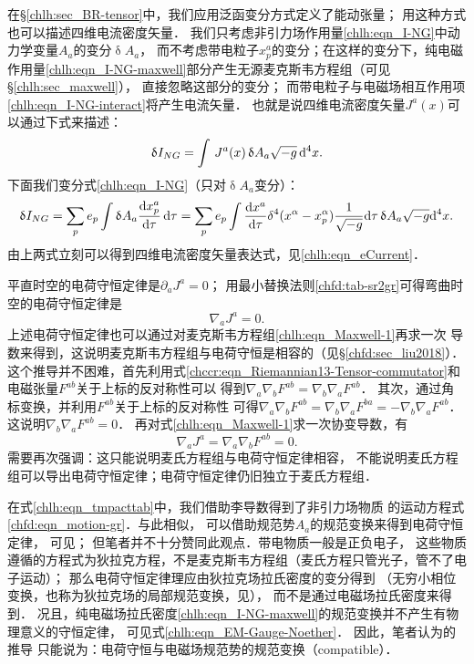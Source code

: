 在\S\ref{chlh:sec_BR-tensor}中，我们应用泛函变分方式定义了能动张量；
用这种方式也可以描述四维电流密度矢量．
我们只考虑非引力场作用量\eqref{chlh:eqn_I-NG}中动力学变量$A_a$的变分$\updelta A_a$，
而不考虑带电粒子$x^a_p$的变分；在这样的变分下，纯电磁
作用量\eqref{chlh:eqn_I-NG-maxwell}部分产生无源麦克斯韦方程组（可见\S\ref{chlh:sec_maxwell}），
直接忽略这部分的变分；
而带电粒子与电磁场相互作用项\eqref{chlh:eqn_I-NG-interact}将产生电流矢量．
也就是说四维电流密度矢量$J^a(x)$可以通过下式来描述：
\begin{equation}
    \updelta I_{NG} =  \int \, J^a(x) \, \updelta A_{a} \sqrt{-g} \, {\rm d}^4 x.
\end{equation}
下面我们变分式\eqref{chlh:eqn_I-NG}（只对$\updelta A_a$变分）：
\begin{equation*}
    \updelta I_{NG} = \sum_{p} e_{p} \int \updelta A_{a}
    \frac{{\rm d} x^a_p}{{\rm d} \tau}  \, {\rm d} \tau
    = \sum_{p} e_{p} \int  \frac{{\rm d} x^a}{{\rm d} \tau}
    \delta^4(x^\alpha-x^\alpha_p)\frac{1}{\sqrt{-g}} {\rm d} \tau
    \, \updelta A_{a} \sqrt{-g} {\rm d}^4 x. 
\end{equation*}
由上两式立刻可以得到四维电流密度矢量表达式，见\eqref{chlh:eqn_eCurrent}．

平直时空的电荷守恒定律是$\partial_a J^a =0 $；
用最小替换法则\ref{chfd:tab-sr2gr}可得弯曲时空的电荷守恒定律是
\begin{equation}\label{chlh:eqn_charge-conservation-curved}
    \nabla_a J^a =0 .
\end{equation}
上述电荷守恒定律也可以通过对麦克斯韦方程组\eqref{chlh:eqn_Maxwell-1}再求一次
导数来得到，这说明麦克斯韦方程组与电荷守恒是相容的（见\S\ref{chfd:sec_liu2018}）．
这个推导并不困难，首先利用式\eqref{chccr:eqn_Riemannian13-Tensor-commutator}和
电磁张量$F^{ab}$关于上标的反对称性可以
得到$\nabla_a \nabla_b F^{ab} = \nabla_b \nabla_a F^{ab}$．
其次，通过角标变换，并利用$F^{ab}$关于上标的反对称性
可得$\nabla_a \nabla_b F^{ab} = \nabla_b \nabla_a F^{ba}=-\nabla_b \nabla_a F^{ab}$．
这说明$\nabla_b \nabla_a F^{ab} = 0$．
再对式\eqref{chlh:eqn_Maxwell-1}求一次协变导数，有
\begin{equation}
    \nabla_a J^a = \nabla_a \nabla_b F^{ab} =0.
\end{equation}
需要再次强调：这只能说明麦氏方程组与电荷守恒定律相容，
不能说明麦氏方程组可以导出电荷守恒定律；电荷守恒定律仍旧独立于麦氏方程组．


在式\eqref{chlh:eqn_tmpacttab}中，我们借助李导数得到了非引力场物质
的运动方程式\eqref{chfd:eqn_motion-gr}．与此相似，
可以借助规范势$A_a$的规范变换来得到电荷守恒定律，
可见\textcite[\S 12.3]{weinberg_grav-1972}；
但笔者并不十分赞同此观点．带电物质一般是正负电子，
这些物质遵循的方程式为狄拉克方程，不是麦克斯韦方程组（麦氏方程只管光子，管不了电子运动）；
{\kaishu 那么电荷守恒定律理应由狄拉克场拉氏密度的变分得到
（无穷小相位变换，也称为狄拉克场的局部规范变换，见\parencite[Eq.(5.25), pp.120]{Greiner-FQ-1996}）}，
而不是通过电磁场拉氏密度来得到．
况且，纯电磁场拉氏密度\eqref{chlh:eqn_I-NG-maxwell}的规范变换并不产生有物理意义的守恒定律，
可见式\eqref{chlh:eqn_EM-Gauge-Noether}．  %
因此，笔者认为\textcite[\S 12.3]{weinberg_grav-1972}的推导
只能说为：电荷守恒与电磁场规范势的规范变换（compatible）．




